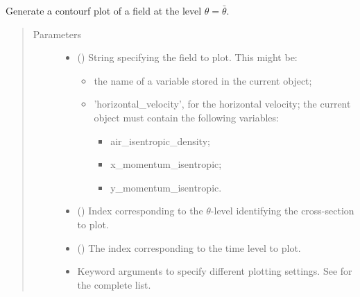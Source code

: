 \documentclass[letterpaper,10pt,english]{sphinxmanual}
\begin{document}
\begin{fulllineitems}
\begin{fulllineitems}
\label{\detokenize{api:storages.state_isentropic.StateIsentropic.contourf_xy}}
Generate a contourf plot of a field at the level \(\theta = \bar{\theta}\).
\begin{quote}\begin{description}
\item[{Parameters}] \leavevmode\begin{itemize}
\item {} 
 () \textendash{} 
String specifying the field to plot. This might be:
\begin{itemize}
\item {} 
the name of a variable stored in the current object;

\item {} 
’horizontal\_velocity’, for the horizontal velocity; the current object must contain the following variables:
\begin{itemize}
\item {} 
air\_isentropic\_density;

\item {} 
x\_momentum\_isentropic;

\item {} 
y\_momentum\_isentropic.

\end{itemize}

\end{itemize}


\item {} 
 () \textendash{} Index corresponding to the \(\theta\)-level identifying the cross-section to plot.

\item {} 
 () \textendash{} The index corresponding to the time level to plot.

\item {} 
 \textendash{} Keyword arguments to specify different plotting settings.
See {\hyperref[\detokenize{api:utils.utils_plot.contourf_xy}]{}} for the complete list.

\end{itemize}


\end{description}
\end{quote}
\end{fulllineitems}
\end{fulllineitems}
\end{document}
